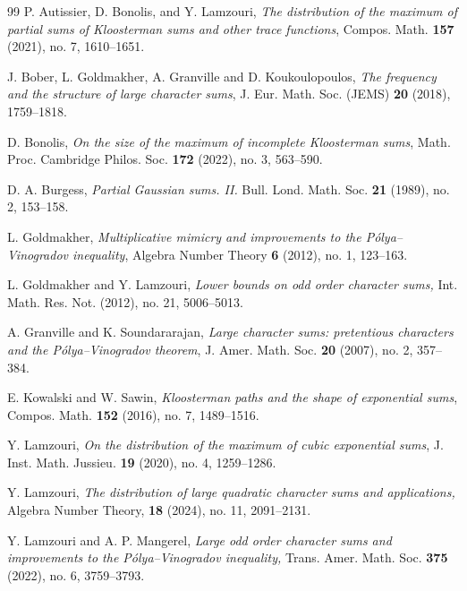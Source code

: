 \documentclass[12pt]{amsart}
\theoremstyle{definition}
\numberwithin{equation}{section}
\numberwithin{equation}{section}
\begin{document}
\begin{thebibliography}{99}
	  P. Autissier, D. Bonolis, and Y. Lamzouri,
	  \emph{The distribution of the maximum of partial sums of Kloosterman sums and other trace functions}, Compos. Math. \textbf{157} (2021),
no. 7, 1610--1651. 

  

     J. Bober, L. Goldmakher, A. Granville and D. Koukoulopoulos, \emph{The frequency and the structure of large character sums}, J. Eur. Math. Soc. (JEMS) \textbf{20} (2018), 1759--1818.

D. Bonolis,
\emph{On the size of the maximum of incomplete Kloosterman sums},
Math. Proc. Cambridge Philos. Soc. \textbf{172} (2022), no. 3, 563--590.

 D. A. Burgess, \emph{Partial Gaussian sums. II.} Bull. Lond. Math. Soc. \textbf{21} (1989), no. 2, 153--158.


 L. Goldmakher, \emph{Multiplicative mimicry and improvements to the Pólya--Vinogradov inequality}, Algebra Number Theory \textbf{6} (2012), no. 1, 123--163.

     L. Goldmakher and Y. Lamzouri, \emph{Lower bounds on odd order character sums,} Int. Math. Res. Not. (2012), no. 21, 5006--5013.

     A. Granville and K. Soundararajan, \emph{Large character sums: pretentious characters and the Pólya--Vinogradov theorem}, J. Amer. Math. Soc. \textbf{20} (2007), no. 2, 357--384.
    

	  E. Kowalski and W. Sawin,
	  \emph{Kloosterman paths and the shape of exponential sums}, Compos. Math. \textbf{152} (2016),
no. 7, 1489--1516.



	  Y. Lamzouri,
	  \emph{On the distribution of the maximum of cubic exponential sums}, J. Inst. Math. Jussieu. \textbf{19} (2020), no. 4, 1259--1286.
  

	  Y. Lamzouri,
	  \emph{The distribution of large quadratic character sums and applications,} Algebra Number Theory, \textbf{18} (2024), no. 11, 2091--2131.

 Y. Lamzouri and A. P. Mangerel, \emph{Large odd order character sums and improvements to the Pólya--Vinogradov inequality,} Trans. Amer. Math. Soc. \textbf{375} (2022), no. 6, 3759--3793.


\end{thebibliography}
\end{document}
